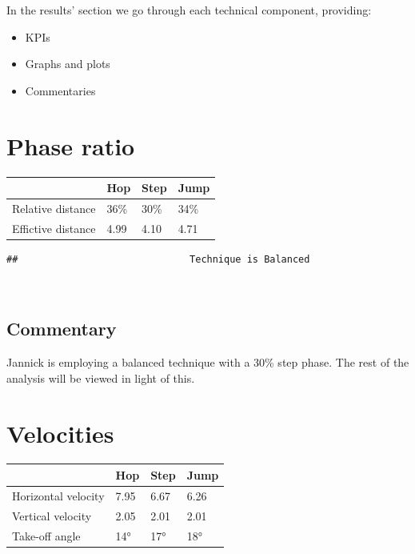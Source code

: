 \documentclass[]{scrreprt}
\providecommand{\tightlist}{%
  \setlength{\itemsep}{0pt}\setlength{\parskip}{0pt}}
\begin{document}
In the results' section we go through each technical component, providing:

\begin{itemize}
\tightlist
\item
  KPIs
\item
  Graphs and plots
\item
  Commentaries
\end{itemize}

\clearpage

\hypertarget{phase-ratio-1}{%
\section{Phase ratio}\label{phase-ratio-1}}

\begin{table}[H]
\centering
\begin{tabular}{l|l|l|l}
\hline
  & Hop & Step & Jump\\
\hline
Relative distance & 36\% & 30\% & 34\%\\
\hline
Effictive distance & 4.99 & 4.10 & 4.71\\
\hline
\end{tabular}
\end{table}

\begin{verbatim}
##                              Technique is Balanced
\end{verbatim}

~

\hypertarget{commentary}{%
\subsection{Commentary}\label{commentary}}

Jannick is employing a balanced technique with a 30\% step phase. The rest of the analysis will be viewed in light of this.

\clearpage

\hypertarget{velocities-1}{%
\section{Velocities}\label{velocities-1}}

\begin{table}[H]
\centering
\begin{tabular}{l|l|l|l}
\hline
  & Hop & Step & Jump\\
\hline
Horizontal velocity & 7.95 & 6.67 & 6.26\\
\hline
Vertical velocity & 2.05 & 2.01 & 2.01\\
\hline
Take-off angle & 14° & 17° & 18°\\
\hline
\end{tabular}
\end{table}
\end{document}
